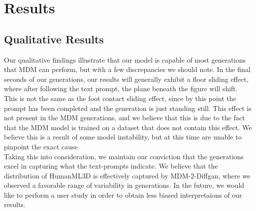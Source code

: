 \documentclass[10pt,twocolumn,letterpaper]{article}
\begin{document}
\section{Results}
\label{sec:results}
\subsection{Qualitative Results}

Our qualitative findings illustrate that our model is capable of most generations that MDM can perform, but with a few discrepancies we should note. In the 
final seconds of our generations, our results will generally exhibit a floor sliding effect, where after following the text prompt, the plane beneath the
figure will shift. This is not the same as the foot contact sliding effect, since by this point the prompt has been completed and the generation is just 
standing still. This effect is not present in the MDM generations, and we believe that this is due to the fact that the MDM model is trained on a dataset
that does not contain this effect. We believe this is a result of some model instability, but at this time are unable to pinpoint the exact cause.
\\

Taking this into consideration, we maintain our conviction that the generations excel in capturing what the text-prompts indicate. We believe that the 
distribution of HumanML3D is effectively captured by MDM-2-Diffgan, where we observed a favorable range of variability in generations. In the future, 
we would like to perform a user study in order to obtain less biased interpretaions of our results. 
\end{document}
